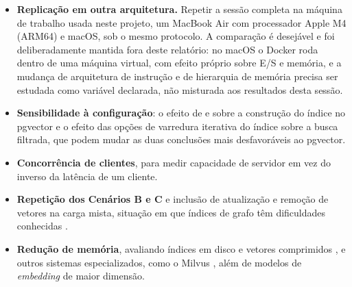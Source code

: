 \begin{itemize}
    \item \textbf{Replicação em outra arquitetura.} Repetir a sessão completa na máquina de trabalho usada neste projeto, um MacBook Air com processador Apple M4 (ARM64) e macOS, sob o mesmo protocolo. A comparação é desejável e foi deliberadamente mantida fora deste relatório: no macOS o Docker roda dentro de uma máquina virtual, com efeito próprio sobre E/S e memória, e a mudança de arquitetura de instrução e de hierarquia de memória precisa ser estudada como variável declarada, não misturada aos resultados desta sessão.
    \item \textbf{Sensibilidade à configuração}: o efeito de  e  sobre a construção do índice no pgvector e o efeito das opções de varredura iterativa do índice sobre a busca filtrada, que podem mudar as duas conclusões mais desfavoráveis ao pgvector.
    \item \textbf{Concorrência de clientes}, para medir capacidade de servidor em vez do inverso da latência de um cliente.
    \item \textbf{Repetição dos Cenários B e C} e inclusão de atualização e remoção de vetores na carga mista, situação em que índices de grafo têm dificuldades conhecidas \cite{singh2021freshdiskann}.
    \item \textbf{Redução de memória}, avaliando índices em disco e vetores comprimidos \cite{subramanya2019diskann}, e outros sistemas especializados, como o Milvus \cite{wang2021milvus}, além de modelos de \textit{embedding} de maior dimensão.
\end{itemize}
